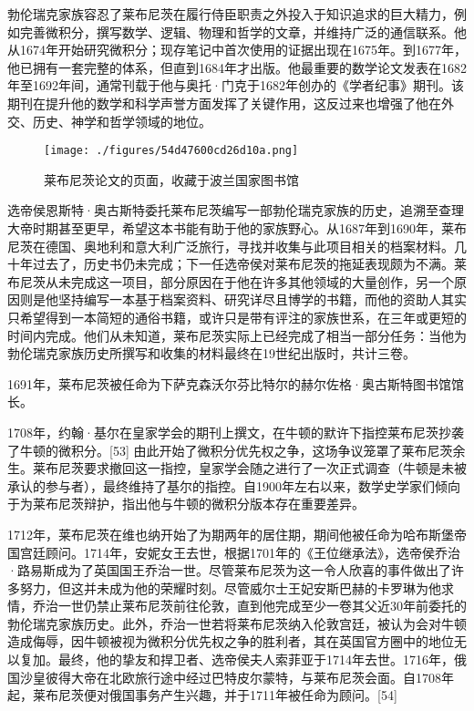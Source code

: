 勃伦瑞克家族容忍了莱布尼茨在履行侍臣职责之外投入于知识追求的巨大精力，例如完善微积分，撰写数学、逻辑、物理和哲学的文章，并维持广泛的通信联系。他从1674年开始研究微积分；现存笔记中首次使用的证据出现在1675年。到1677年，他已拥有一套完整的体系，但直到1684年才出版。他最重要的数学论文发表在1682年至1692年间，通常刊载于他与奥托·门克于1682年创办的《学者纪事》期刊。该期刊在提升他的数学和科学声誉方面发挥了关键作用，这反过来也增强了他在外交、历史、神学和哲学领域的地位。
\begin{figure}[ht]
\centering
\texttt{[image: ./figures/54d47600cd26d10a.png]}
\caption{莱布尼茨论文的页面，收藏于波兰国家图书馆} \label{fig_LBNC_4}
\end{figure}
选帝侯恩斯特·奥古斯特委托莱布尼茨编写一部勃伦瑞克家族的历史，追溯至查理大帝时期甚至更早，希望这本书能有助于他的家族野心。从1687年到1690年，莱布尼茨在德国、奥地利和意大利广泛旅行，寻找并收集与此项目相关的档案材料。几十年过去了，历史书仍未完成；下一任选帝侯对莱布尼茨的拖延表现颇为不满。莱布尼茨从未完成这一项目，部分原因在于他在许多其他领域的大量创作，另一个原因则是他坚持编写一本基于档案资料、研究详尽且博学的书籍，而他的资助人其实只希望得到一本简短的通俗书籍，或许只是带有评注的家族世系，在三年或更短的时间内完成。他们从未知道，莱布尼茨实际上已经完成了相当一部分任务：当他为勃伦瑞克家族历史所撰写和收集的材料最终在19世纪出版时，共计三卷。

1691年，莱布尼茨被任命为下萨克森沃尔芬比特尔的赫尔佐格·奥古斯特图书馆馆长。

1708年，约翰·基尔在皇家学会的期刊上撰文，在牛顿的默许下指控莱布尼茨抄袭了牛顿的微积分。[53] 由此开始了微积分优先权之争，这场争议笼罩了莱布尼茨余生。莱布尼茨要求撤回这一指控，皇家学会随之进行了一次正式调查（牛顿是未被承认的参与者），最终维持了基尔的指控。自1900年左右以来，数学史学家们倾向于为莱布尼茨辩护，指出他与牛顿的微积分版本存在重要差异。

1712年，莱布尼茨在维也纳开始了为期两年的居住期，期间他被任命为哈布斯堡帝国宫廷顾问。1714年，安妮女王去世，根据1701年的《王位继承法》，选帝侯乔治·路易斯成为了英国国王乔治一世。尽管莱布尼茨为这一令人欣喜的事件做出了许多努力，但这并未成为他的荣耀时刻。尽管威尔士王妃安斯巴赫的卡罗琳为他求情，乔治一世仍禁止莱布尼茨前往伦敦，直到他完成至少一卷其父近30年前委托的勃伦瑞克家族历史。此外，乔治一世若将莱布尼茨纳入伦敦宫廷，被认为会对牛顿造成侮辱，因牛顿被视为微积分优先权之争的胜利者，其在英国官方圈中的地位无以复加。最终，他的挚友和捍卫者、选帝侯夫人索菲亚于1714年去世。1716年，俄国沙皇彼得大帝在北欧旅行途中经过巴特皮尔蒙特，与莱布尼茨会面。自1708年起，莱布尼茨便对俄国事务产生兴趣，并于1711年被任命为顾问。[54]
